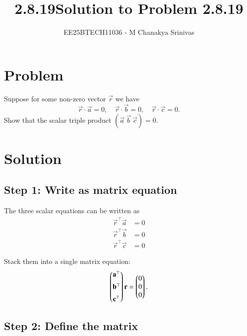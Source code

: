 \documentclass[journal]{IEEEtran}
\begin{document}

\vspace{3cm}

\title{2.8.19}
\author{EE25BTECH11036 - M Chanakya Srinivas}
\maketitle

\renewcommand{\thetable}{\theenumi}
\setlength{\intextsep}{10pt}
\renewcommand\theequation{\arabic{equation}}


\title{Solution to Problem 2.8.19}
\author{}
\date{}
\maketitle



\section*{Problem}
Suppose for some non-zero vector \(\vec r\) we have
\[
\vec r \cdot \vec a = 0,\quad
\vec r \cdot \vec b = 0,\quad
\vec r \cdot \vec c = 0.
\]
Show that the scalar triple product \((\vec a\ \vec b\ \vec c) = 0\).

\section*{Solution}

\subsection*{Step 1: Write as matrix equation}

The three scalar equations can be written as
\begin{align}
\vec r^\top \vec a &= 0 \\
\vec r^\top \vec b &= 0 \\
\vec r^\top \vec c &= 0
\end{align}

Stack them into a single matrix equation:
\begin{align}
\begin{pmatrix}
\mathbf a^\top \\[2mm]
\mathbf b^\top \\[2mm]
\mathbf c^\top
\end{pmatrix} \mathbf r
=
\begin{pmatrix}0\\0\\0\end{pmatrix}.
\end{align}

\subsection*{Step 2: Define the matrix}
\end{document}
